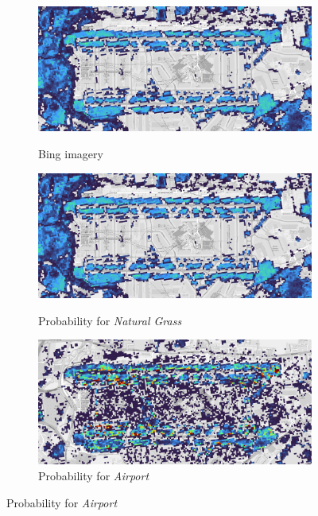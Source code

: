         \begin{figure}[H]
        \centering
        \begin{subfigure}[b]{0.6\textwidth}
            \centering
            \caption{Bing imagery}
            \includegraphics[width=\textwidth]{figs_06/airport_natural_grass.png}
            \label{fig:airport_bing}
        \end{subfigure}
        \begin{subfigure}[b]{0.6\textwidth}
            \centering
            \caption{Probability for \textit{Natural Grass}}
            \includegraphics[width=\textwidth]{figs_06/airport_natural_grass.png}
            \label{fig:airport_natural_gras}
        \end{subfigure}
        \begin{subfigure}[b]{0.6\textwidth}
            \centering
            \caption{Probability for \textit{Airport}}
            \includegraphics[width=\textwidth]{figs_06/airport_airport.png}

\end{subfigure}
\end{figure}
